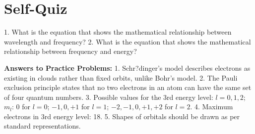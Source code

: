\documentclass{article}
\begin{document}
\section*{Self-Quiz}
1. What is the equation that shows the mathematical relationship between wavelength and frequency?
2. What is the equation that shows the mathematical relationship between frequency and energy?

\textbf{Answers to Practice Problems:}
1. Schr?dinger's model describes electrons as existing in clouds rather than fixed orbits, unlike Bohr's model.
2. The Pauli exclusion principle states that no two electrons in an atom can have the same set of four quantum numbers.
3. Possible values for the 3rd energy level: $l = 0, 1, 2$; $m_l$: $0$ for $l=0$; $-1, 0, +1$ for $l=1$; $-2, -1, 0, +1, +2$ for $l=2$.
4. Maximum electrons in 3rd energy level: 18.
5. Shapes of orbitals should be drawn as per standard representations.
\end{document}
